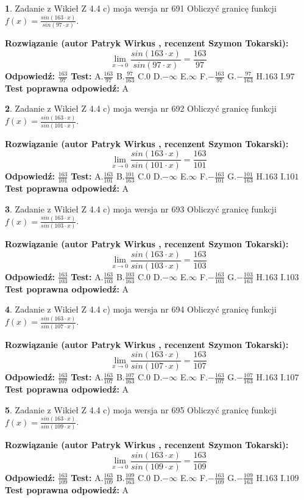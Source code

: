 \documentclass[12pt, a4paper]{article}
\theoremstyle{definition} %
\newtheorem{zad}{}
\newcommand{\zadStart}[1]{\begin{zad}#1\newline}
\newcommand{\zadStop}{\end{zad}}
\newcommand{\rozwStart}[2]{\noindent \textbf{Rozwiązanie (autor #1 , recenzent #2): }\newline}
\newcommand{\rozwStop}{\newline}
\newcommand{\odpStart}{\noindent \textbf{Odpowiedź:}\newline}
\newcommand{\odpStop}{\newline}
\newcommand{\testStart}{\noindent \textbf{Test:}\newline}
\newcommand{\testStop}{\newline}
\newcommand{\kluczStart}{\noindent \textbf{Test poprawna odpowiedź:}\newline}
\newcommand{\kluczStop}{\newline}
\begin{document}
\zadStart{Zadanie z Wikieł Z 4.4 c) moja wersja nr 691}
Obliczyć granicę funkcji $f(x)=\frac{sin(163\cdot x)}{sin(97\cdot x)}$.
\zadStop
\rozwStart{Patryk Wirkus}{Szymon Tokarski}
$$\lim\limits_{x\to 0}\frac{sin(163\cdot x)}{sin(97\cdot x)}=
\frac{163}{97}$$
\rozwStop
\odpStart
$\frac{163}{97}$
\odpStop
\testStart
A.$\frac{163}{97}$
B.$\frac{97}{163}$
C.$0$
D.$-\infty$
E.$\infty$
F.$-\frac{163}{97}$
G.$-\frac{97}{163}$
H.$163$
I.$97$
\testStop
\kluczStart
A
\kluczStop



\zadStart{Zadanie z Wikieł Z 4.4 c) moja wersja nr 692}
Obliczyć granicę funkcji $f(x)=\frac{sin(163\cdot x)}{sin(101\cdot x)}$.
\zadStop
\rozwStart{Patryk Wirkus}{Szymon Tokarski}
$$\lim\limits_{x\to 0}\frac{sin(163\cdot x)}{sin(101\cdot x)}=
\frac{163}{101}$$
\rozwStop
\odpStart
$\frac{163}{101}$
\odpStop
\testStart
A.$\frac{163}{101}$
B.$\frac{101}{163}$
C.$0$
D.$-\infty$
E.$\infty$
F.$-\frac{163}{101}$
G.$-\frac{101}{163}$
H.$163$
I.$101$
\testStop
\kluczStart
A
\kluczStop



\zadStart{Zadanie z Wikieł Z 4.4 c) moja wersja nr 693}
Obliczyć granicę funkcji $f(x)=\frac{sin(163\cdot x)}{sin(103\cdot x)}$.
\zadStop
\rozwStart{Patryk Wirkus}{Szymon Tokarski}
$$\lim\limits_{x\to 0}\frac{sin(163\cdot x)}{sin(103\cdot x)}=
\frac{163}{103}$$
\rozwStop
\odpStart
$\frac{163}{103}$
\odpStop
\testStart
A.$\frac{163}{103}$
B.$\frac{103}{163}$
C.$0$
D.$-\infty$
E.$\infty$
F.$-\frac{163}{103}$
G.$-\frac{103}{163}$
H.$163$
I.$103$
\testStop
\kluczStart
A
\kluczStop



\zadStart{Zadanie z Wikieł Z 4.4 c) moja wersja nr 694}
Obliczyć granicę funkcji $f(x)=\frac{sin(163\cdot x)}{sin(107\cdot x)}$.
\zadStop
\rozwStart{Patryk Wirkus}{Szymon Tokarski}
$$\lim\limits_{x\to 0}\frac{sin(163\cdot x)}{sin(107\cdot x)}=
\frac{163}{107}$$
\rozwStop
\odpStart
$\frac{163}{107}$
\odpStop
\testStart
A.$\frac{163}{107}$
B.$\frac{107}{163}$
C.$0$
D.$-\infty$
E.$\infty$
F.$-\frac{163}{107}$
G.$-\frac{107}{163}$
H.$163$
I.$107$
\testStop
\kluczStart
A
\kluczStop



\zadStart{Zadanie z Wikieł Z 4.4 c) moja wersja nr 695}
Obliczyć granicę funkcji $f(x)=\frac{sin(163\cdot x)}{sin(109\cdot x)}$.
\zadStop
\rozwStart{Patryk Wirkus}{Szymon Tokarski}
$$\lim\limits_{x\to 0}\frac{sin(163\cdot x)}{sin(109\cdot x)}=
\frac{163}{109}$$
\rozwStop
\odpStart
$\frac{163}{109}$
\odpStop
\testStart
A.$\frac{163}{109}$
B.$\frac{109}{163}$
C.$0$
D.$-\infty$
E.$\infty$
F.$-\frac{163}{109}$
G.$-\frac{109}{163}$
H.$163$
I.$109$
\testStop
\kluczStart
A
\kluczStop
\end{document}
